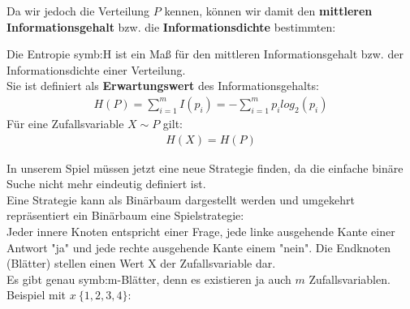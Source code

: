 Da wir jedoch die Verteilung $P$ kennen, können wir damit den \textbf{mittleren Informationsgehalt} bzw. die 
\textbf{Informationsdichte} bestimmten:\\
\begin{definition}[Entropie]
Die Entropie \gls{symb:H} ist ein Maß für den mittleren Informationsgehalt bzw. der Informationsdichte einer Verteilung.\\
Sie ist definiert als \textbf{Erwartungswert} des Informationsgehalts:
\begin{align}
H(P) = \sum_{i=1}^{m}I(p_i) = - \sum_{i=1}^{m}p_i log_2(p_i)
\end{align}
Für eine Zufallsvariable $X \sim P$ gilt:
\begin{align}
H(X) = H(P)
\end{align}
\end{definition}

In unserem Spiel müssen jetzt eine neue Strategie finden, da die einfache binäre Suche nicht mehr eindeutig definiert ist.\\
Eine Strategie kann als Binärbaum dargestellt werden und umgekehrt repräsentiert ein Binärbaum eine Spielstrategie:\\
Jeder innere Knoten entspricht einer Frage, jede linke ausgehende Kante einer Antwort "ja" und jede rechte ausgehende Kante einem "nein". Die Endknoten (Blätter) stellen einen Wert X der Zufallsvariable dar.\\
Es gibt genau \gls{symb:m}-Blätter, denn es existieren ja auch $m$ Zufallsvariablen.
Beispiel mit $x ~ \lbrace 1, 2, 3, 4 \rbrace$:\\
\begin{center}
\end{center}


